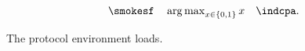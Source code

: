 \documentclass{article}
\begin{document}
\[
\smokesf \quad \argmax_{x \in \bits} x \quad \indcpa.
\]
\begin{protocolbox}
The protocol environment loads.
\end{protocolbox}
\end{document}
